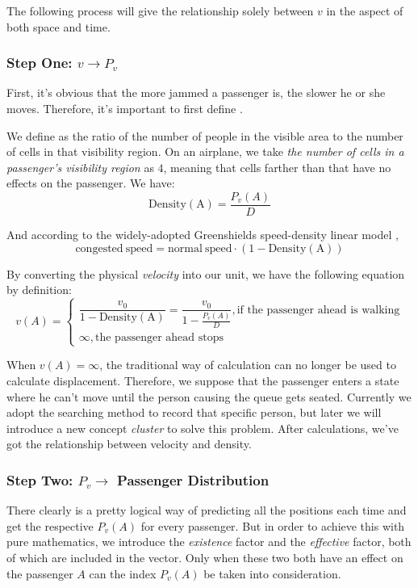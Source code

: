 \documentclass{article}
\theoremstyle{definition}
\theoremstyle{remark}
\numberwithin{equation}{section}
\begin{document}
	The following process will give the relationship solely between \(v\) in the aspect of both space and time.
	\subsubsection{Step One: \(v\to P_v\)}
	First, it's obvious that the more jammed a passenger is, the slower he or she moves. Therefore, it's important to first define .

	We define  as the ratio of the number of people in the visible area to the number of cells in that visibility region. On an airplane, we take \textit{the number of cells in a passenger's visibility region} as \(4\), meaning that cells farther than that have no effects on the passenger. We have:
	\[\mathrm{Density\left(A\right)} = \dfrac{P_v\left(A\right)}{D}\]

	And according to the widely-adopted Greenshields speed-density linear model \cite{greenshields}, \[\mathrm{congested\:speed} = \mathrm{normal\:speed}\cdot\left(1-\mathrm{Density\left(A\right)}\right)\]

	By converting the physical \textit{velocity} into our unit, we have the following equation by definition:
	\[v(A)=\begin{cases}\dfrac{v_0}{1-\mathrm{Density\left(A\right)}}=\dfrac{v_0}{1-\frac{P_v\left(A\right)}{D}}, \text{if the passenger ahead is walking}\\\infty, \text{the passenger ahead stops}\end{cases}\]

	When \(v\left(A\right)=\infty\), the traditional way of calculation can no longer be used to calculate displacement. Therefore, we suppose that the passenger enters a state where he can't move until the person causing the queue gets seated. Currently we adopt the searching method to record that specific person, but later we will introduce a new concept \textit{cluster} to solve this problem.
	 After calculations, we've got the relationship between velocity and density.
	\subsubsection{Step Two: \(P_v\to \) Passenger Distribution}
	There clearly is a pretty logical way of predicting all the positions each time and get the respective \(P_v\left(A\right)\) for every passenger. But in order to achieve this with pure mathematics, we introduce the \textit{existence} factor and the \textit{effective} factor, both of which are included in the vector. Only when these two both have an effect on the passenger \(A\) can the index \(P_v\left(A\right)\) be taken into consideration.
\end{document}
